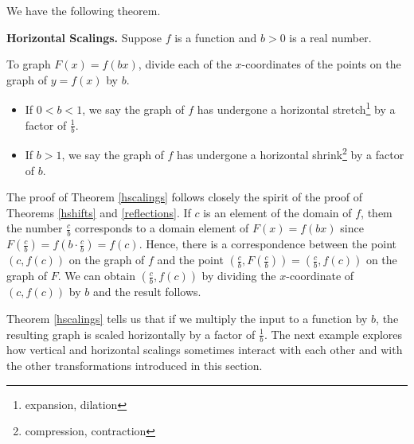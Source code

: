 \documentclass{ximera}
\begin{document}
We have the following theorem.

\smallskip



\begin{theorem}  \label{hscalings}\textbf{Horizontal Scalings.}  Suppose $f$ is a function and $b>0$ is a real number.

To graph $F(x) = f(bx)$, divide each of the $x$-coordinates of the points on the graph of $y=f(x)$ by $b$. 


\begin{itemize}

\item If $0 < b < 1$, we say the graph of $f$ has undergone a horizontal stretch\footnote{expansion, dilation} by a factor of $\frac{1}{b}$. 

\item If $b > 1$, we say the graph of $f$ has undergone a horizontal shrink\footnote{compression, contraction} by a factor of $b$.

\end{itemize}

\end{theorem}


\smallskip

The proof of Theorem \ref{hscalings} follows closely the spirit of the proof of Theorems \ref{hshifts} and \ref{reflections}.  If $c$ is an element of the domain of $f$, them the number $\frac{c}{b}$ corresponds to a domain element of $F(x)= f(bx)$ since $F\left(\frac{c}{b} \right) = f\left( b \cdot \frac{c}{b} \right) = f(c)$.  Hence, there is a correspondence between the point  $(c, f(c))$ on the graph of $f$ and the point $\left( \frac{c}{b}, F\left(\frac{c}{b}\right) \right)= \left( \frac{c}{b}, f(c) \right)$ on the graph of $F$.  We can obtain    $ \left( \frac{c}{b}, f(c) \right)$ by dividing the $x$-coordinate of $(c, f(c))$ by $b$ and the result follows.  

\smallskip

Theorem \ref{hscalings} tells us that if we multiply the input to a function by $b$, the resulting graph is scaled horizontally by a factor of $\frac{1}{b}$.    The next example explores how vertical and horizontal scalings sometimes interact with each other and with the other transformations introduced in this section. 

\smallskip
\end{document}

